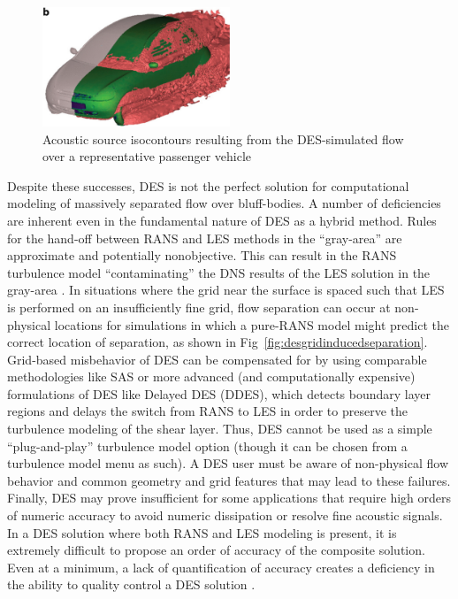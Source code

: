 \documentclass[journal]{new-aiaa}
\begin{document}
\begin{figure}[H]
\begin{center}
\includegraphics[width=0.5\textwidth]{Images/logan/spalart2009detachededdy_carDES.pdf}
\caption{ Acoustic source isocontours resulting from the DES-simulated flow over a representative passenger vehicle \cite{mendonca2002towards} }
\label{fig:cardes}
\end{center}
\end{figure}




Despite these successes, DES is not the perfect solution for computational modeling of massively separated flow over bluff-bodies. A number of deficiencies are inherent even in the fundamental nature of DES as a hybrid method. Rules for the hand-off between RANS and LES methods in the ``gray-area'' are approximate and potentially nonobjective. This can result in the RANS turbulence model ``contaminating'' the DNS results of the LES solution in the gray-area \cite{spalart2009detachededdy}. In situations where the grid near the surface is spaced such that LES is performed on an insufficiently fine grid, flow separation can occur at non-physical locations for simulations in which a pure-RANS model might predict the correct location of separation, as shown in Fig~\ref{fig:desgridinducedseparation}. Grid-based misbehavior of DES can be compensated for by using comparable methodologies like SAS or more advanced (and computationally expensive) formulations of DES like Delayed DES (DDES), which detects boundary layer regions and delays the switch from RANS to LES in order to preserve the turbulence modeling of the shear layer. Thus, DES cannot be used as a simple ``plug-and-play'' turbulence model option (though it can be chosen from a turbulence model menu as such). A DES user must be aware of non-physical flow behavior and common geometry and grid features that may lead to these failures. Finally, DES may prove insufficient for some applications that require high orders of numeric accuracy to avoid numeric dissipation or resolve fine acoustic signals. In a DES solution where both RANS and LES modeling is present, it is extremely difficult to propose an order of accuracy of the composite solution. Even at a minimum, a lack of quantification of accuracy creates a deficiency in the ability to quality control a DES solution \cite{spalart2009detachededdy}.
\end{document}
